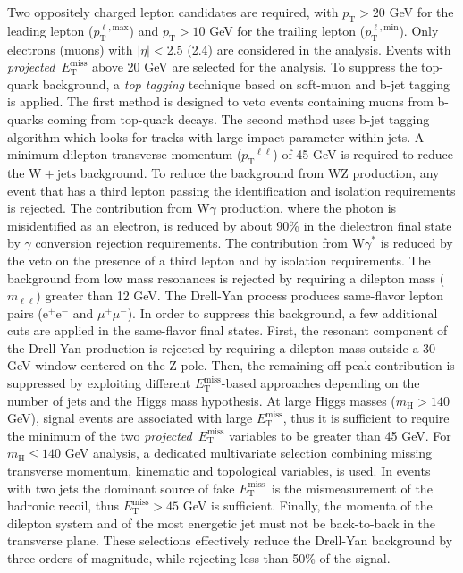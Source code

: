 \documentclass{PoS}
\newcommand{\W}{\ensuremath{\mathrm{W}}}
\newcommand{\Wjets}{\ensuremath{\mathrm{W+jets}}}
\newcommand{\Z}{\ensuremath{\mathrm{Z}}}
\newcommand{\WZ}{\ensuremath{\W\Z}}
\newcommand{\Elp}{\ensuremath{\mathrm{\mathrm{e}}^{+}}}
\newcommand{\Elm}{\ensuremath{\mathrm{\mathrm{e}}^{-}}}
\newcommand{\Mp}{\ensuremath{\mu^{+}}}
\newcommand{\Mm}{\ensuremath{\mu^{-}}}
\newcommand{\Lep}{\ensuremath{\mathrm{\ell}}}
\newcommand{\mHi}{\ensuremath{m_{\mathrm{H}}}}
\newcommand{\mll}{\ensuremath{m_{\Lep\Lep}}}
\newcommand{\pt}{\ensuremath{p_\mathrm{T}}}
\newcommand{\ptlmax}{\ensuremath{p_{\mathrm{T}}^{\Lep,\mathrm{max}}}}
\newcommand{\ptlmin}{\ensuremath{p_{\mathrm{T}}^{\Lep,\mathrm{min}}}}
\newcommand{\ETm}{\ensuremath{E_{\mathrm{T}}^{\mathrm{miss}}}}
\newcommand{\MET}{\ETm}
\newcommand{\GAMMA}{\ensuremath{\gamma}}
\newcommand{\wgamma}{\ensuremath{\W\GAMMA}}
\begin{document}
Two oppositely charged lepton candidates are required, with $\pt >20$
GeV for the leading lepton ($\ptlmax$) and $\pt >10$ GeV for the
trailing lepton ($\ptlmin$).  Only electrons (muons) with $|\eta|
<$2.5 (2.4) are considered in the analysis.  Events with
\textit{projected}~$\MET$ above 20 GeV are selected for the analysis.
To suppress the top-quark background, a \textit{top tagging} technique
based on soft-muon and b-jet tagging~\cite{btag} is applied. The first
method is designed to veto events containing muons from b-quarks
coming from top-quark decays.  The second method uses b-jet tagging
algorithm which looks for tracks with large impact parameter within
jets.  A minimum dilepton transverse momentum ($\pt^{\ell\ell}$) of 45
GeV is required to reduce the $\Wjets$ background.  To reduce the
background from $\WZ$ production, any event that has a third lepton
passing the identification and isolation requirements is rejected. The
contribution from $\wgamma$ production, where the photon is
misidentified as an electron, is reduced by about 90\% in the
dielectron final state by $\GAMMA$ conversion rejection requirements.
The contribution from $\wgamma^{*}$ is reduced by the veto on the
presence of a third lepton and by isolation requirements.  The
background from low mass resonances is rejected by requiring a
dilepton mass ($\mll$) greater than 12 GeV.  The Drell-Yan process
produces same-flavor lepton pairs ($\Elp\Elm$ and $\Mp\Mm$). In order
to suppress this background, a few additional cuts are applied in the
same-flavor final states.  First, the resonant component of the
Drell-Yan production is rejected by requiring a dilepton mass outside
a 30 GeV window centered on the $\Z$ pole.  Then, the remaining
off-peak contribution is suppressed by exploiting different \MET-based
approaches depending on the number of jets and the Higgs mass
hypothesis.  At large Higgs masses ($\mHi > 140$ GeV), signal events
are associated with large \MET, thus it is sufficient to require the
minimum of the two \textit{projected}~$\MET$ variables to be greater
than 45 GeV. For $\mHi \leq 140$ GeV analysis, a dedicated
multivariate selection combining missing transverse momentum,
kinematic and topological variables, is used. In events with two jets
the dominant source of fake \MET\ is the mismeasurement of the
hadronic recoil, thus $\MET > 45$ GeV is sufficient.  Finally, the
momenta of the dilepton system and of the most energetic jet must not
be back-to-back in the transverse plane. These selections effectively
reduce the Drell-Yan background by three orders of magnitude, while
rejecting less than 50\% of the signal.
\end{document}
